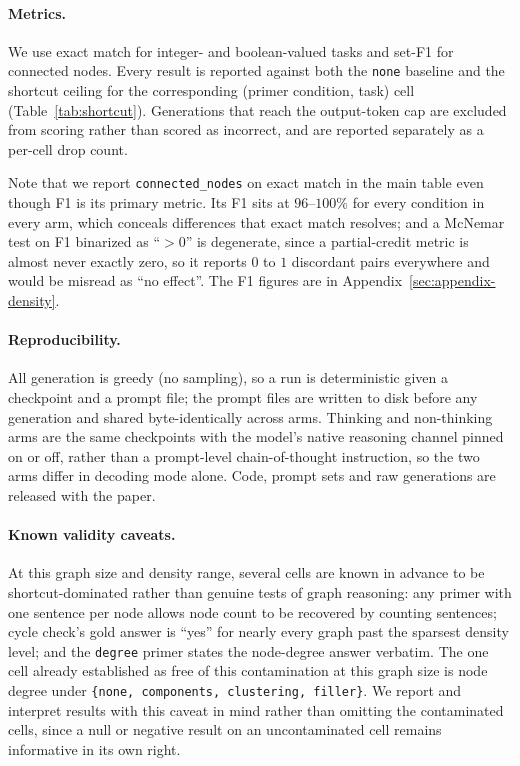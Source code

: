 \documentclass[11pt]{article}
\begin{document}
\paragraph{Metrics.} We use exact match for integer- and boolean-valued
tasks and set-F1 for connected nodes. Every result is reported against
both the \texttt{none} baseline and the shortcut ceiling for the
corresponding (primer condition, task) cell (Table~\ref{tab:shortcut}).
Generations that reach the output-token cap are excluded from scoring
rather than scored as incorrect, and are reported separately as a per-cell
drop count.

Note that we report \texttt{connected\_nodes} on exact match in the main
table even though F1 is its primary metric. Its F1 sits at $96$--$100\%$
for every condition in every arm, which conceals differences that exact
match resolves; and a McNemar test on F1 binarized as ``$>0$'' is
degenerate, since a partial-credit metric is almost never exactly zero, so
it reports $0$ to $1$ discordant pairs everywhere and would be misread as
``no effect''. The F1 figures are in Appendix~\ref{sec:appendix-density}.

\paragraph{Reproducibility.} All generation is greedy (no sampling), so a
run is deterministic given a checkpoint and a prompt file; the prompt files
are written to disk before any generation and shared byte-identically
across arms. Thinking and non-thinking arms are the same checkpoints with
the model's native reasoning channel pinned on or off, rather than a
prompt-level chain-of-thought instruction, so the two arms differ in
decoding mode alone. Code, prompt sets and raw generations are released
with the paper.

\paragraph{Known validity caveats.} At this graph size and density range,
several cells are known in advance to be shortcut-dominated rather than
genuine tests of graph reasoning: any primer with one sentence per node
allows node count to be recovered by counting sentences; cycle check's
gold answer is ``yes'' for nearly every graph past the sparsest density
level; and the \texttt{degree} primer states the node-degree answer
verbatim. The one cell already established as free of this contamination
at this graph size is node degree under \texttt{\{none, components,
clustering, filler\}}. We report and interpret results with this caveat in
mind rather than omitting the contaminated cells, since a null or negative
result on an uncontaminated cell remains informative in its own right.
\end{document}

